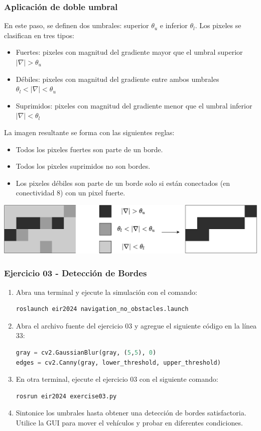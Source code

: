 \begin{frame}\frametitle{Aplicación de doble umbral}
  En este paso, se definen dos umbrales: superior $\theta_u$ e inferior $\theta_l$. Los pixeles se clasifican en tres tipos:
  \begin{itemize}
  \item Fuertes: pixeles con magnitud del gradiente mayor que el umbral superior $|\nabla | > \theta_u$
  \item Débiles: pixeles con magnitud del gradiente entre ambos umbrales $\theta_l < |\nabla| < \theta_u$
  \item Suprimidos: pixeles con magnitud del gradiente menor que el umbral inferior $|\nabla| < \theta_l$
  \end{itemize}
  La imagen resultante se forma con las siguientes reglas:
  \begin{itemize}
  \item Todos los pixeles fuertes son parte de un borde.
  \item Todos los pixeles suprimidos no son bordes. 
  \item Los pixeles débiles son parte de un borde solo si están conectados (en conectividad 8) con un pixel fuerte.
  \end{itemize}
  \includegraphics[width=\textwidth]{Figuras/DoubleThreshold.pdf}
\end{frame}

\begin{frame}[containsverbatim]\frametitle{Ejercicio 03 - Detección de Bordes}
  \begin{enumerate}
  \item Abra una terminal y ejecute la simulación con el comando:
    \begin{lstlisting}[language=bash,numbers=none]
roslaunch eir2024 navigation_no_obstacles.launch
    \end{lstlisting}
  \item Abra el archivo fuente del ejercicio 03 y agregue el siguiente código en la línea 33:
    \begin{lstlisting}[language=Python, firstnumber=33]
gray = cv2.GaussianBlur(gray, (5,5), 0)
edges = cv2.Canny(gray, lower_threshold, upper_threshold)
    \end{lstlisting}
  \item En otra terminal, ejecute el ejercicio 03 con el siguiente comando:
    \begin{lstlisting}[language=bash,numbers=none]
rosrun eir2024 exercise03.py
    \end{lstlisting}
  \item Sintonice los umbrales hasta obtener una detección de bordes satisfactoria. Utilice la GUI para mover el vehículos y probar en diferentes condiciones. 
  \end{enumerate}
\end{frame}

